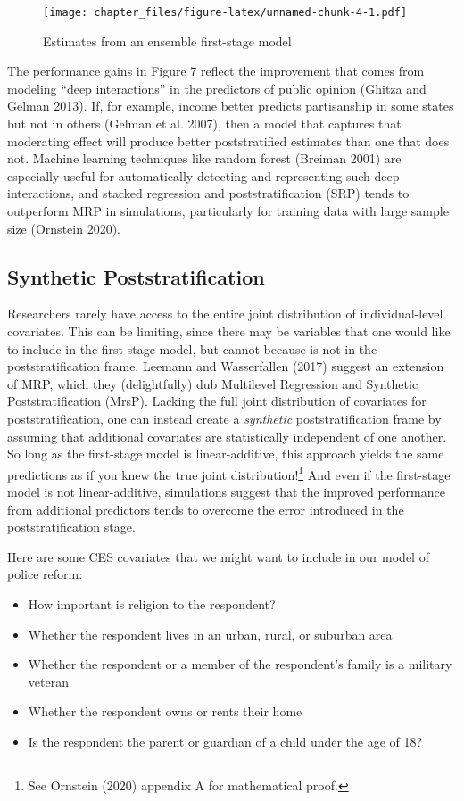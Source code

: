\documentclass[
]{article}
\providecommand{\tightlist}{%
  \setlength{\itemsep}{0pt}\setlength{\parskip}{0pt}}
\begin{document}
\begin{figure}
\centering
\texttt{[image: chapter\_files/figure-latex/unnamed-chunk-4-1.pdf]}
\caption{Estimates from an ensemble first-stage model}
\end{figure}

The performance gains in Figure 7 reflect the improvement that comes
from modeling ``deep interactions'' in the predictors of public opinion
(Ghitza and Gelman 2013). If, for example, income better predicts
partisanship in some states but not in others (Gelman et al. 2007), then
a model that captures that moderating effect will produce better
poststratified estimates than one that does not. Machine learning
techniques like random forest (Breiman 2001) are especially useful for
automatically detecting and representing such deep interactions, and
stacked regression and poststratification (SRP) tends to outperform MRP
in simulations, particularly for training data with large sample size
(Ornstein 2020).

\hypertarget{synthetic-poststratification}{%
\subsection{Synthetic
Poststratification}\label{synthetic-poststratification}}

Researchers rarely have access to the entire joint distribution of
individual-level covariates. This can be limiting, since there may be
variables that one would like to include in the first-stage model, but
cannot because is not in the poststratification frame. Leemann and
Wasserfallen (2017) suggest an extension of MRP, which they
(delightfully) dub Multilevel Regression and Synthetic
Poststratification (MrsP). Lacking the full joint distribution of
covariates for poststratification, one can instead create a
\emph{synthetic} poststratification frame by assuming that additional
covariates are statistically independent of one another. So long as the
first-stage model is linear-additive, this approach yields the same
predictions as if you knew the true joint distribution!\footnote{See
  Ornstein (2020) appendix A for mathematical proof.} And even if the
first-stage model is not linear-additive, simulations suggest that the
improved performance from additional predictors tends to overcome the
error introduced in the poststratification stage.

Here are some CES covariates that we might want to include in our model
of police reform:

\begin{itemize}
\tightlist
\item
  How important is religion to the respondent?
\item
  Whether the respondent lives in an urban, rural, or suburban area
\item
  Whether the respondent or a member of the respondent's family is a
  military veteran
\item
  Whether the respondent owns or rents their home
\item
  Is the respondent the parent or guardian of a child under the age of
  18?
\end{itemize}
\end{document}
